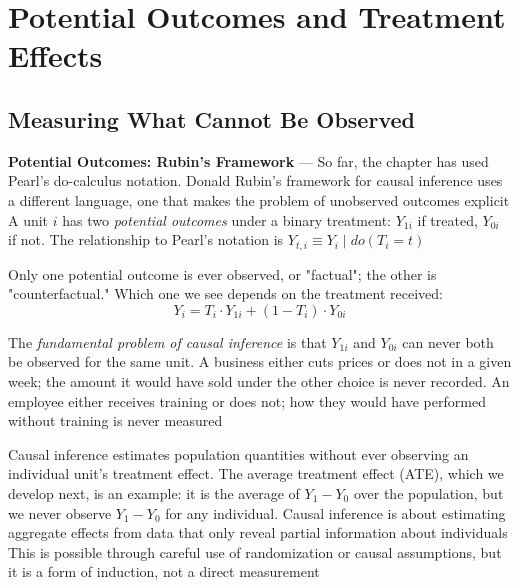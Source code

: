 \section{Potential Outcomes and Treatment Effects}
\label{sec:potential-outcomes-treatment-effects}

\subsection{Measuring What Cannot Be Observed}
\label{subsec:measuring-what-cannot-be-observed}

\textbf{Potential Outcomes: Rubin's Framework} --- So far, the chapter has used Pearl's
do-calculus notation. Donald Rubin's framework for causal inference uses a
different language, one that makes the problem of unobserved outcomes explicit A
unit $i$ has two \emph{potential outcomes} under a binary treatment: $Y_{1i}$ if
treated, $Y_{0i}$ if not. The relationship to Pearl's notation is $Y_{t,i}\equiv
Y_{i}\mid do(T_{i}= t)$

Only one potential outcome is ever observed, or "factual"; the other is "counterfactual."
Which one we see depends on the treatment received:
\begin{equation}
  Y_{i}= T_{i}\cdot Y_{1i}+ (1 - T_{i}) \cdot Y_{0i}\label{eq:factual-counterfactual}
\end{equation}

The \emph{fundamental problem of causal inference} is that $Y_{1i}$ and $Y_{0i}$
can never both be observed for the same unit. A business either cuts prices or does
not in a given week; the amount it would have sold under the other choice is
never recorded. An employee either receives training or does not; how they would
have performed without training is never measured

Causal inference estimates population quantities without ever observing an individual
unit's treatment effect. The average treatment effect (ATE), which we develop next,
is an example: it is the average of $Y_{1}- Y_{0}$ over the population, but we
never observe $Y_{1}- Y_{0}$ for any individual. Causal inference is about estimating
aggregate effects from data that only reveal partial information about individuals
This is possible through careful use of randomization or causal assumptions, but
it is a form of induction, not a direct measurement

